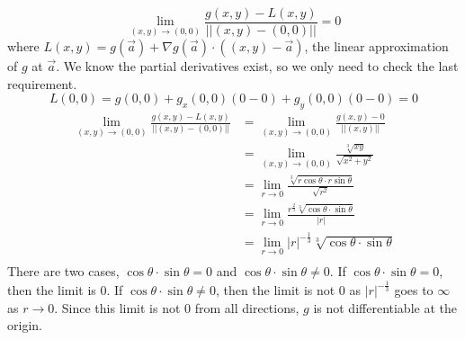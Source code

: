 \documentclass{article}
\begin{document}
\begin{solution}{}{}
\begin{enumerate}[label=\textbf{\alph*}.]
        \[\lim_{(x,y)\to(0,0)}\frac{g(x,y)-L(x,y)}{||(x,y)-(0,0)||}=0\]
        where $L(x,y)=g(\vec{a})+\nabla g(\vec{a})\cdot ((x,y)-\vec{a})$, the linear approximation of $g$ at $\vec{a}$. We know the partial derivatives exist, so we only need to check the last requirement.
        \[L(0,0)=g(0,0)+g_x(0,0)(0-0)+g_y(0,0)(0-0)=0\]
        \begin{align*}
            \lim_{(x,y)\to(0,0)}\frac{g(x,y)-L(x,y)}{||(x,y)-(0,0)||}&=\lim_{(x,y)\to(0,0)}\frac{g(x,y)-0}{||(x,y)||}\\
            &=\lim_{(x,y)\to(0,0)}\frac{\sqrt[3]{xy}}{\sqrt{x^2+y^2}}\\
            &=\lim_{r\to0}\frac{\sqrt[3]{r\cos{\theta} \cdot r\sin{\theta}}}{\sqrt{r^2}}\\
            &=\lim_{r\to0}\frac{r^{\frac{2}{3}}\sqrt[3]{\cos{\theta} \cdot \sin{\theta}}}{|r|}\\
            &=\lim_{r\to0}|r|^{-\frac{1}{3}}\sqrt[3]{\cos{\theta} \cdot \sin{\theta}}\\
        \end{align*}
        There are two cases, $\cos{\theta}\cdot\sin{\theta}=0$ and $\cos{\theta}\cdot\sin{\theta}\neq0$. If $\cos{\theta}\cdot\sin{\theta}=0$, then the limit is 0. If $\cos{\theta}\cdot\sin{\theta}\neq0$, then the limit is not 0 as $|r|^{-\frac{1}{3}}$ goes to $\infty$ as $r\to 0$. Since this limit is not 0 from all directions, $g$ is not differentiable at the origin.
    \end{enumerate}
\end{solution}
\end{document}
